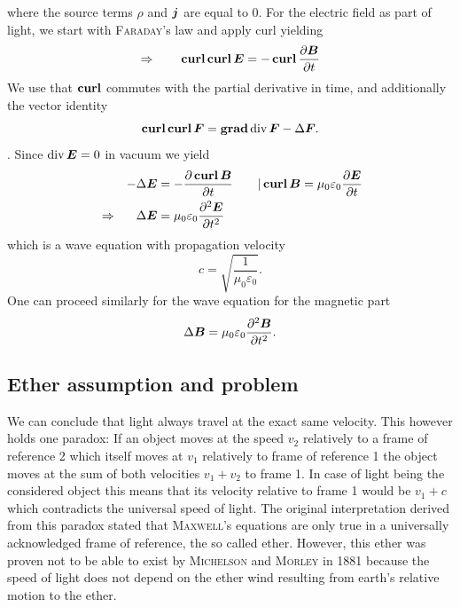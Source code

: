 \documentclass[12pt,
               open=any,
               twoside,
               a4paper,
               titlepage,
               bibliography=totoc,
               xcolor=dvipsnames,
               ]{scrartcl}
\theoremstyle{definition}
\theoremstyle{definition}
\begin{document}
			 where the source terms $\rho$ and $\boldsymbol{j}$ are equal to 0. For the electric field as part of light, we start with \textsc{Faraday}'s law and apply curl yielding
			\begin{equation}
				\Rightarrow \qquad \operatorname*{\mathbf{curl}} \operatorname*{\mathbf{curl}} \boldsymbol{E} = -\operatorname*{\mathbf{curl}} \frac{\partial \boldsymbol{B}}{\partial t}
			\end{equation}
			We use that $\operatorname*{\mathbf{curl}}$ commutes with the partial derivative in time, and additionally the vector identity
			\begin{equation}
				\operatorname*{\mathbf{curl}} \operatorname*{\mathbf{curl}} \boldsymbol{F} = \operatorname*{\mathbf{grad}} \operatorname*{div} \boldsymbol{F} - \Delta \boldsymbol{F}\text{.}
			\end{equation}
			. Since $\operatorname*{div} \boldsymbol{E} = 0$ in vacuum we yield
			\begin{align}
				& & -\Delta \boldsymbol{E} & = -\frac{\partial \operatorname*{\mathbf{curl}} \boldsymbol{B}}{\partial t} \qquad \vert \operatorname*{\mathbf{curl}} \boldsymbol{B} = \mu_0\varepsilon_0 \frac{\partial \boldsymbol{E}}{\partial t} \nonumber\\
				& \Rightarrow & \Delta \boldsymbol{E} & = \mu_0\varepsilon_0 \frac{\partial^2 \boldsymbol{E}}{\partial t^2}
			\end{align}
			which is a wave equation with propagation velocity
			\begin{equation}
				c = \sqrt{\frac{1}{\mu_0\varepsilon_0}} \text{.}
			\end{equation}
			One can proceed similarly for the wave equation for the magnetic part
			\begin{equation}
				\Delta \boldsymbol{B} = \mu_0\varepsilon_0 \frac{\partial^2 \boldsymbol{B}}{\partial t^2} \text{.}
			\end{equation}
		\subsection{Ether assumption and problem}
			We can conclude that light always travel at the exact same velocity. This however holds one paradox: If an object moves at the speed $v_2$ relatively to a frame of reference 2 which itself moves at $v_1$ relatively to frame of reference 1 the object moves at the sum of both velocities $v_1 + v_2$ to frame 1. In case of light being the considered object this means that its velocity relative to frame 1 would be $v_1 + c$ which contradicts the universal speed of light. The original interpretation derived from this paradox stated that \textsc{Maxwell}'s equations are only true in a universally acknowledged frame of reference, the so called ether. However, this ether was proven not to be able to exist by \textsc{Michelson} and \textsc{Morley} in 1881 because the speed of light does not depend on the ether wind resulting from earth's relative motion to the ether.
			
\end{document}
